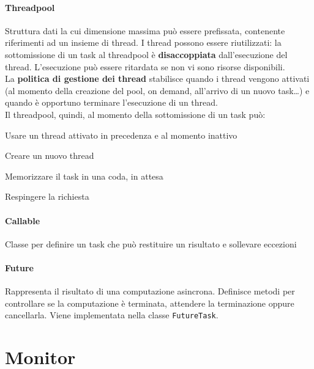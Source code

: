 \documentclass[10pt]{article}
\begin{document}
\paragraph{Threadpool} Struttura dati la cui dimensione massima può essere prefissata, contenente riferimenti ad un insieme di thread. I thread possono essere riutilizzati: la sottomissione di un task al threadpool è \textbf{disaccoppiata} dall'esecuzione del thread. L'esecuzione può essere ritardata se non vi sono risorse disponibili.\\
La \textbf{politica di gestione dei thread} stabilisce quando i thread vengono attivati (al momento della creazione del pool, on demand, all'arrivo di un nuovo task\ldots) e quando è opportuno terminare l'esecuzione di un thread.\\
Il threadpool, quindi, al momento della sottomissione di un task può:
\begin{list}{}{}
	\item Usare un thread attivato in precedenza e al momento inattivo
	\item Creare un nuovo thread
	\item Memorizzare il task in una coda, in attesa
	\item Respingere la richiesta
\end{list}
\paragraph{Callable} Classe per definire un task che può restituire un risultato e sollevare eccezioni
\paragraph{Future} Rappresenta il risultato di una computazione asincrona. Definisce metodi per controllare se la computazione è terminata, attendere la terminazione oppure cancellarla. Viene implementata nella classe \texttt{FutureTask}.
\section{Monitor}
\end{document}
